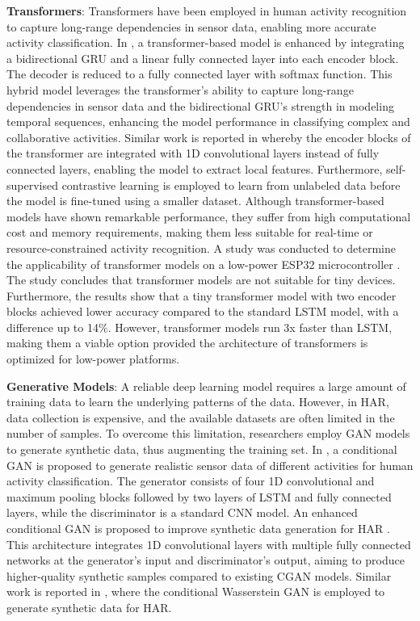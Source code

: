 \documentclass[preprint,12pt]{elsarticle}
\begin{document}
\textbf{Transformers}: Transformers have been employed in human activity recognition to capture long-range dependencies in sensor data, enabling more accurate activity classification. In \citep{chen_transformer_2022}, a transformer-based model is enhanced by integrating a bidirectional GRU and a linear fully connected layer into each encoder block. The decoder is reduced to a fully connected layer with softmax function. This hybrid model leverages the transformer's ability to capture long-range dependencies in sensor data and the bidirectional GRU's strength in modeling temporal sequences, enhancing the model performance in classifying complex and collaborative activities. Similar work is reported in \citep{sun_efficient_2024} whereby the encoder blocks of the transformer are integrated with 1D convolutional layers instead of fully connected layers, enabling the model to extract local features. Furthermore, self-supervised contrastive learning is employed to learn from unlabeled data before the model is fine-tuned using a smaller dataset. Although transformer-based models have shown remarkable performance, they suffer from high computational cost and memory requirements, making them less suitable for real-time or resource-constrained activity recognition. A study was conducted to determine the applicability of transformer models on a low-power ESP32 microcontroller \citep{lattanzi_are_2025}. The study concludes that transformer models are not suitable for tiny devices. Furthermore, the results show that a tiny transformer model with two encoder blocks achieved lower accuracy compared to the standard LSTM model, with a difference up to 14\%. However, transformer models run 3x faster than LSTM, making them a viable option provided the architecture of transformers is optimized for low-power platforms.

\textbf{Generative Models}: A reliable deep learning model requires a large amount of training data to learn the underlying patterns of the data. However, in HAR, data collection is expensive, and the available datasets are often limited in the number of samples. To overcome this limitation, researchers employ GAN models to generate synthetic data, thus augmenting the training set. In \citep{chan_unified_2021}, a conditional GAN is proposed to generate realistic sensor data of different activities for human activity classification. The generator consists of four 1D convolutional and maximum pooling blocks followed by two layers of LSTM and fully connected layers, while the discriminator is a standard CNN model. An enhanced conditional GAN is proposed to improve synthetic data generation for HAR \citep{jimale_fully_2022}. This architecture integrates 1D convolutional layers with multiple fully connected networks at the generator's input and discriminator's output, aiming to produce higher-quality synthetic samples compared to existing CGAN models. Similar work is reported in \citep{lupion_data_2024}, where the conditional Wasserstein GAN is employed to generate synthetic data for HAR. 
\end{document}
